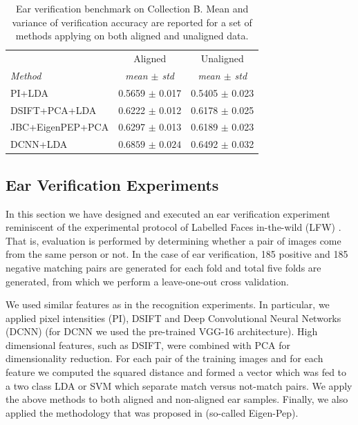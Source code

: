 {    \begin{table}[ht]
    \centering
    \scriptsize
    \begin{tabular}{|l|c|c|}
    \hline
    
                            &   Aligned             &   Unaligned  \\
    \emph{Method}    & \emph{mean $\pm$ std} & \emph{mean $\pm$ std} \\
    \hline\hline
    PI+LDA           & 0.5659 $\pm$ 0.017    & 0.5405 $\pm$ 0.023 \\
    DSIFT+PCA+LDA    & 0.6222 $\pm$ 0.012    & 0.6178 $\pm$ 0.025 \\
    JBC+EigenPEP+PCA & 0.6297 $\pm$ 0.013    & 0.6189 $\pm$ 0.023 \\
    DCNN+LDA         & $\bm{0.6859}$ $\pm$ $\bm{0.024}$    & 0.6492 $\pm$ 0.032 \\
    \hline
    \end{tabular}
    \caption{Ear verification benchmark on Collection B. Mean and variance of verification accuracy are reported for a set of methods applying on both aligned and unaligned data.}
    \label{tab:ear_verification_benchmark}
    \end{table}
}


\subsection{Ear Verification Experiments}

In this section we have designed and executed an ear verification experiment reminiscent of the experimental protocol of Labelled Faces in-the-wild (LFW) \cite{huang2007labeled}.  That is, evaluation is performed by determining whether a pair of images come from the same person or not. In the case of ear verification, 185 positive and 185 negative matching pairs are generated for each fold and total five folds are generated, from which we perform a leave-one-out cross validation.

We used similar features as in the recognition experiments. In particular, we applied pixel intensities (PI), DSIFT and Deep Convolutional Neural Networks (DCNN) \cite{simonyan2014very} (for DCNN we used the pre-trained VGG-16 architecture). High dimensional features, such as DSIFT, were combined with PCA for dimensionality reduction. For each pair of the training images and for each feature we computed the squared distance and formed a vector which was fed to a two class LDA or SVM which separate match versus not-match pairs. We apply the above methods to both aligned and non-aligned ear samples. Finally, we also applied the methodology that was proposed in \cite{li2014eigen} (so-called Eigen-Pep).


